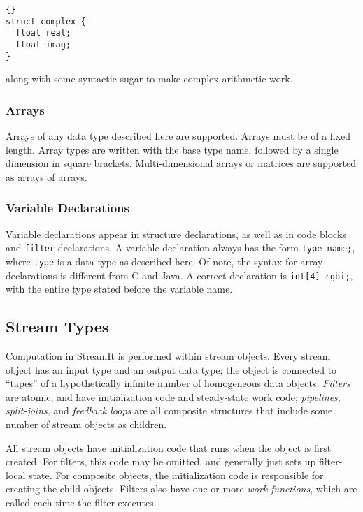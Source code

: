 \documentclass[11pt]{article}
\begin{document}
\begin{lstlisting}{}
struct complex {
  float real;
  float imag;
}
\end{lstlisting}{}

\noindent
along with some syntactic sugar to make complex arithmetic work.

\subsubsection{Arrays}

Arrays of any data type described here are supported.  Arrays must be
of a fixed length.  Array types are written with the base type name,
followed by a single dimension in square brackets.  Multi-dimensional
arrays or matrices are supported as arrays of arrays.

\subsubsection{Variable Declarations}

Variable declarations appear in structure declarations, as well as in
code blocks and \lstinline|filter| declarations.  A variable declaration
always has the form \lstinline|type name;|, where \lstinline|type| is a data
type as described here.  Of note, the syntax for array declarations is
different from C and Java.  A correct declaration is
\lstinline|int[4] rgbi;|, with the entire type stated before the variable name.


\subsection{Stream Types}

Computation in StreamIt is performed within stream objects.  Every
stream object has an input type and an output data type; the object is
connected to ``tapes'' of a hypothetically infinite number of
homogeneous data objects.  \emph{Filters} are atomic, and have
initialization code and steady-state work code; \emph{pipelines},
\emph{split-joins}, and \emph{feedback loops} are all composite
structures that include some number of stream objects as children.

All stream objects have initialization code that runs when the object
is first created.  For filters, this code may be omitted, and
generally just sets up filter-local state.  For composite objects, the
initialization code is responsible for creating the child objects.
Filters also have one or more \emph{work functions}, which are called
each time the filter executes.
\end{document}
